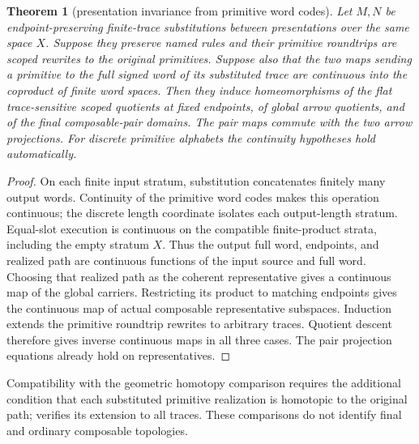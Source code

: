 \documentclass[10pt,reqno]{amsart}
\theoremstyle{definition}
\theoremstyle{plain}
\newtheorem{theorem}[definition]{Theorem}
\theoremstyle{remark}
\newcommand{\LeanName}[1]{\path{#1}}
\begin{document}
\begin{theorem}[presentation invariance from primitive word codes]
\label{thm:flat-word-invariance}
Let $M,N$ be endpoint-preserving finite-trace substitutions between
presentations over the same space $X$. Suppose they preserve named rules and
their primitive roundtrips are scoped rewrites to the original primitives.
Suppose also that the two maps sending a primitive to the full signed word
of its substituted trace are continuous into the coproduct of finite word
spaces. Then they induce homeomorphisms of the flat trace-sensitive scoped
quotients at fixed endpoints, of global arrow quotients, and of the final
composable-pair domains. The pair maps commute with the two arrow projections.
For discrete primitive alphabets the continuity hypotheses hold automatically.
\end{theorem}
\begin{proof}
On each finite input stratum, substitution concatenates finitely many output
words. Continuity of the primitive word codes makes this operation continuous;
the discrete length coordinate isolates each output-length stratum. Equal-slot
execution is continuous on the compatible finite-product strata, including
the empty stratum $X$. Thus the output full word, endpoints, and realized path
are continuous functions of the input source and full word. Choosing that
realized path as the coherent representative gives a continuous map of the
global carriers. Restricting its product to matching endpoints gives the
continuous map of actual composable representative subspaces.
Induction extends the primitive roundtrip rewrites to arbitrary traces.
Quotient descent therefore gives inverse continuous maps in all three cases.
The pair projection equations already hold on representatives.
\end{proof}

Compatibility with the geometric homotopy comparison requires the additional
condition that
each substituted primitive realization is homotopic to the original path;
\LeanName{WordSubstitution.map_flat_homotopic} verifies its extension to all
traces. These comparisons do not identify final and ordinary composable topologies.
\end{document}
